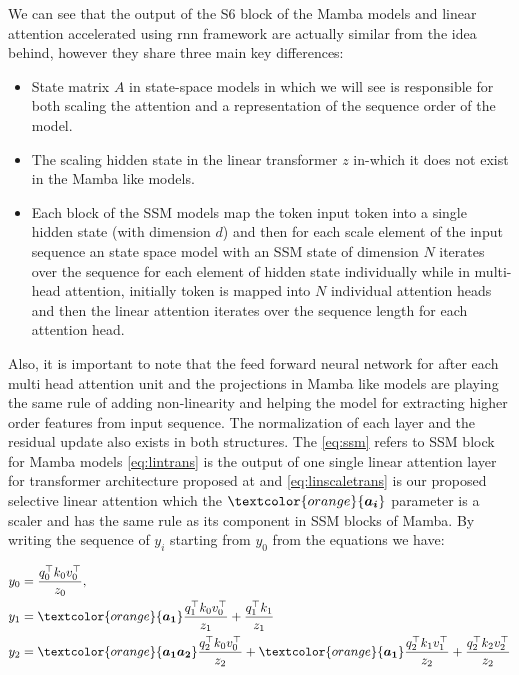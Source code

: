 We can see that the output of the S6 block of the Mamba models and linear attention accelerated using \gls{rnn} framework are actually similar from the idea behind, however they share three main key differences:
\begin{itemize}
    \item State matrix $A$ in state-space models in which we will see is responsible for both scaling the attention and a representation of the sequence order of the model.
    \item The scaling hidden state in the linear transformer $z$ in-which it does not exist in the Mamba like models.
    \item Each block of the SSM models map the token input token into a single hidden state (with dimension $d$) and then for each scale element of the input sequence an state space model with an SSM state of dimension $N$ iterates over the sequence for each element of hidden state individually while in multi-head attention, initially token is mapped into $N$ individual attention heads and then the linear attention iterates over the sequence length for each attention head.
\end{itemize}
Also, it is important to note that the feed forward neural network for after each multi head attention unit and the projections in Mamba like models are playing the same rule of adding non-linearity and helping the model for extracting higher order features from input sequence. The normalization of each layer and the residual update also exists in both structures. The \eqref{eq:ssm} refers to SSM block for Mamba models \eqref{eq:lintrans} is the output of one single linear attention layer for transformer architecture proposed at \cite{trans_rnn} and \eqref{eq:linscaletrans} is our proposed selective linear attention which the $\textcolor{orange}{\boldsymbol{a_i}} $ parameter is a scaler and has the same rule as its component in SSM blocks of Mamba. By writing the sequence of $y_i$ starting from $y_0$ from the equations we have:

\begin{align*}
    y_0 &= \frac{q_0^{\top}k_0v_0^{\top}}{z_0}, \\
    y_1 &= \textcolor{orange}{\boldsymbol{a_1}}\frac{q_1^{\top}k_0v_0^{\top}}{z_1} + \frac{q_1^{\top}k_1 }{z_1} \\
    y_2 &= \textcolor{orange}{\boldsymbol{a_1a_2}}\frac{q_2^{\top}k_0v_0^{\top}}{z_2} + \textcolor{orange}{\boldsymbol{a_1}}\frac{q_2^{\top}k_1v_1^{\top} }{z_2} + \frac{q_2^{\top}k_2v_2^{\top} }{z_2} \\
\end{align*}

